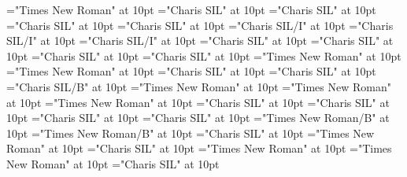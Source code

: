 \documentclass[a4paper,twoside]{article}
\begin{document}
\font\spanptxitemptdefinitionLcptsensesensesentryletDatadicBody="Times New Roman" at 10pt
\font\spanendefinitionLcptsensesensesentryletDatadicBody="Charis SIL" at 10pt
\font\xitemendefinitionLcptsensesensesentryletDatadicBody="Charis SIL" at 10pt
\font\spanenxitemendefinitionLcptsensesensesentryletDatadicBody="Charis SIL" at 10pt
\font\examplessensesensesentryletDatadicBody="Charis SIL" at 10pt
\font\examplesehexamplessensesensesentryletDatadicBody="Charis SIL/I" at 10pt
\font\spansehexamplesehexamplessensesensesentryletDatadicBody="Charis SIL/I" at 10pt
\font\spanenexamplesehexamplessensesensesentryletDatadicBody="Charis SIL/I" at 10pt
\font\spanenexamplessensesensesentryletDatadicBody="Charis SIL" at 10pt
\font\variantrefsentryletDatadicBody="Charis SIL" at 10pt
\font\spanenvariantrefsentryletDatadicBody="Charis SIL" at 10pt
\font\variantrefentrytypevariantrefsentryletDatadicBody="Charis SIL" at 10pt
\font\LexEntryTypepublishStemVariantTypeReverseAbbrPubptvariantrefentrytypevariantrefsentryletDatadicBody="Times New Roman" at 10pt
\font\spanptLexEntryTypepublishStemVariantTypeReverseAbbrPubptvariantrefentrytypevariantrefsentryletDatadicBody="Times New Roman" at 10pt
\font\spanenLexEntryTypepublishStemVariantTypeReverseAbbrPubptvariantrefentrytypevariantrefsentryletDatadicBody="Charis SIL" at 10pt
\font\spanenvariantrefentrytypevariantrefsentryletDatadicBody="Charis SIL" at 10pt
\font\variantrefformsehvariantrefsentryletDatadicBody="Charis SIL/B" at 10pt
\font\pictureRightentryletDatadicBody="Times New Roman" at 10pt
\font\picturepictureRightentryletDatadicBody="Times New Roman" at 10pt
\font\pictureCaptionpictureRightentryletDatadicBody="Times New Roman" at 10pt
\font\pictureSensepictureCaptionpictureRightentryletDatadicBody="Charis SIL" at 10pt
\font\spanenpictureSensepictureCaptionpictureRightentryletDatadicBody="Charis SIL" at 10pt
\font\pictureLabelsehpictureCaptionpictureRightentryletDatadicBody="Charis SIL" at 10pt
\font\spansehpictureLabelsehpictureCaptionpictureRightentryletDatadicBody="Charis SIL" at 10pt
\font\xsensenumbersensesensesentryletDatadicBody="Times New Roman/B" at 10pt
\font\xsensenumberaftersensesensesentryletDatadicBody="Times New Roman/B" at 10pt
\font\spanensensesentryletDatadicBody="Charis SIL" at 10pt
\font\xitemxitemdefinitionLcbeforedefinitionLcptsensesensesentryletDatadicBody="Times New Roman" at 10pt
\font\etymologyentryletDatadicBody="Charis SIL" at 10pt
\font\etymologyformptetymologyentryletDatadicBody="Times New Roman" at 10pt
\font\spanptetymologyformptetymologyentryletDatadicBody="Times New Roman" at 10pt
\font\spanenetymologyformptetymologyentryletDatadicBody="Charis SIL" at 10pt
\end{document}

